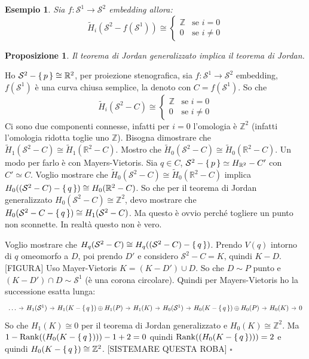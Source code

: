 \documentclass[10pt, twoside=false, x11names]{scrbook}
\newtheorem{proposition}[theorem]{Proposizione}
\newtheorem{example}[theorem]{Esempio}
\newenvironment{proof}{{\textbf{Dimostrazione}:}}{\hfill $\square$}
\newcommand{\Z}{\mathbb{Z}}
\newcommand{\rank}[1]{\mathrm{Rank}( #1 )}
\newcommand{\RN}[1][]{\mathbb{R}^#1}
\newcommand{\Sph}[1][]{\mathcal{S}^#1}
\let\setminus-
\begin{document}
\begin{example}
  Sia $ f \colon \Sph{1} \to \Sph{2} $ embedding allora:
  \[
    \tilde{H}_i(\Sph{2} \setminus f(\Sph{1})) \cong
    \begin{cases}
      \Z & \text{se } i = 0 \\
      0 & \text{se } i \not = 0
    \end{cases}
  \]
\end{example}

\begin{proposition}
  Il teorema di Jordan generalizzato implica il teorema di Jordan.
\end{proposition}
\begin{proof}
  Ho $ \Sph{2} \setminus \set{p} \cong \RN{2} $, per proiezione stenografica,
  sia $ f \colon \Sph{1} \to \Sph{2} $ embedding,
  $ f(\Sph{1}) $ è una curva chiusa semplice, la denoto con $ C = f(\Sph{1})$. So che
  \[
    \tilde{H}_i(\Sph{2} \setminus C ) \cong
    \begin{cases}
      \Z & \text{se } i = 0 \\
      0 & \text{se } i \not = 0
    \end{cases}
  \]
  Ci sono due componenti connesse, infatti per $ i = 0 $ l'omologia è $ \Z^2 $ (infatti
  l'omologia ridotta toglie uno $ \Z $). Bisogna dimostrare che
  $ \tilde{H}_1(\Sph{2} \setminus C) \cong \tilde{H}_1(\RN{2} \setminus C) $. Mostro che
  $ \tilde{H}_0(\Sph{2} \setminus C) \cong \tilde{H}_0(\RN{2} \setminus C) $. Un modo per farlo è
  con Mayers-Vietoris. Sia $ q \in C $,
  $ \Sph{2} \setminus \set{p} \simeq H_{\RN{2}} \setminus C' $ con $ C' \simeq C $.
  Voglio mostrare che  $ \tilde{H}_0(\Sph{2} \setminus C) \cong \tilde{H}_0(\RN{2} \setminus C) $
  implica $ H_0((\Sph{2} \setminus C) \setminus \set{q}) \cong H_0(\RN{2} \setminus C) $.
  So che per il teorema di Jordan generalizzato $ H_0(\Sph{2} \setminus C) \cong \Z^2 $,
  devo mostrare che $ H_0(\Sph{2} \setminus C \setminus \set{q}) \cong H_1(\Sph{2} \setminus C) $.
  Ma questo è ovvio perché togliere un punto non sconnette. In realtà questo non
  è vero.

  Voglio mostrare che $ H_q(\Sph{2} \setminus C) \cong H_q((\Sph{2} \setminus C) \setminus \set{q}) $.
  Prendo $ V(q) $ intorno di $ q $ omeomorfo a $ D $, poi prendo $ D' $
  e considero $ \Sph{2} \setminus C = K $, quindi $ K \setminus D $.
  [FIGURA]
  Uso Mayer-Vietoris $ K = (K \setminus D') \cup D $. So che $ D \sim P $ punto e
  $ (K \setminus D') \cap D \sim \Sph{1} $ (è una corona circolare). Quindi per
  Mayers-Vietoris ho la successione esatta lunga:
  \[
    \begin{tikzcd}[nodes={column sep=7pt}]
      \dots \rar & H_1(\Sph{1}) \rar & H_1(K \setminus \set{q}) \oplus H_1(P) \rar & H_1(K) \rar & H_0(\Sph{1}) \rar & H_0(K \setminus \set{q})
      \oplus H_0(P) \rar & H_0(K) \rar & 0
    \end{tikzcd}
  \]
  So che $ H_1(K) \cong 0 $ per il teorema di Jordan generalizzato e $ H_0(K) \cong \Z^2 $.
  Ma $ 1 - \rank{(H_0(K \setminus \set{q}))} -1 + 2 = 0 $ quindi $ \rank{(H_0(K \setminus \set{q}))} = 2 $
  e quindi $ H_0(K \setminus \set{q}) \cong \Z^2 $.
  [SISTEMARE QUESTA ROBA]
\end{proof}
\end{document}
